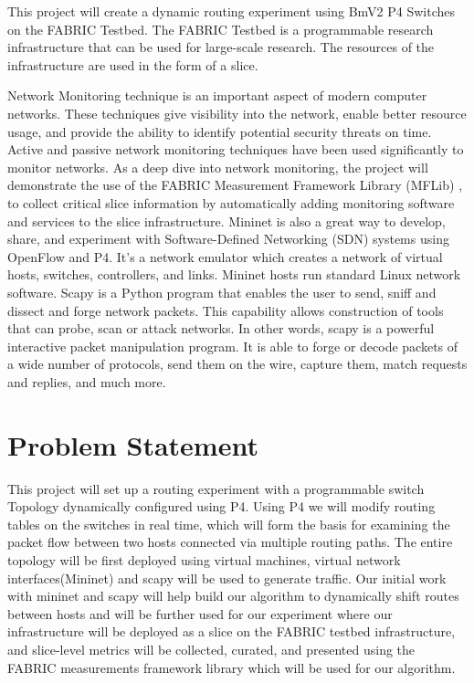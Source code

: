 \documentclass[conference]{IEEEtran}
\begin{document}
    This project will create a dynamic routing experiment using BmV2 P4 Switches on the FABRIC Testbed. The FABRIC Testbed is a programmable research infrastructure that can be used for large-scale research. The resources of the infrastructure are used in the form of a slice.

    Network Monitoring technique is an important aspect of modern computer networks. These techniques give visibility into the network, enable better resource usage, and provide the ability to identify potential security threats on time. Active and passive network monitoring techniques have been used significantly to monitor networks. As a deep dive into network monitoring, the project will demonstrate the use of the FABRIC Measurement Framework Library (MFLib) \cite{b3}, to collect critical slice information by automatically adding monitoring software and services to the slice infrastructure.
    Mininet is also a great way to develop, share, and experiment with Software-Defined Networking (SDN) systems using OpenFlow and P4. It's a network emulator which creates a network of virtual hosts, switches, controllers, and links. Mininet hosts run standard Linux network software.
    Scapy is a Python program that enables the user to send, sniff and dissect and forge network packets. This capability allows construction of tools that can probe, scan or attack networks.
    In other words, scapy is a powerful interactive packet manipulation program. It is able to forge or decode packets of a wide number of protocols, send them on the wire, capture them, match requests and replies, and much more.



    \section{Problem Statement}
    This project will set up a routing experiment with a programmable switch Topology dynamically configured using P4. Using P4 we will modify routing tables on the switches in real time, which will form the basis for examining the packet flow between two hosts connected via multiple routing paths. The entire topology will be first deployed using virtual machines, virtual network interfaces(Mininet) and scapy will be used to generate traffic. Our initial work with mininet and scapy will help build our algorithm to dynamically shift routes between hosts and will be further used for our experiment  where our infrastructure will be deployed as a slice on the FABRIC testbed infrastructure, and slice-level metrics will be collected, curated, and presented using the FABRIC measurements framework library which will be used for our algorithm.\\
\end{document}
